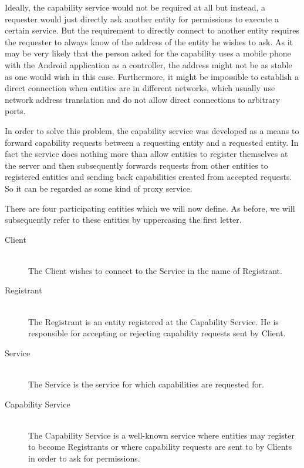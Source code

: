 Ideally, the capability service would not be required at all but instead, a requester would just directly ask another entity for permissions to execute a certain service.
But the requirement to directly connect to another entity requires the requester to always know of the address of the entity he wishes to ask.
As it may be very likely that the person asked for the capability uses a mobile phone with the Android application as a controller, the address might not be as stable as one would wish in this case.
Furthermore, it might be impossible to establish a direct connection when entities are in different networks, which usually use network address translation and do not allow direct connections to arbitrary ports.

In order to solve this problem, the capability service was developed as a means to forward capability requests between a requesting entity and a requested entity.
In fact the service does nothing more than allow entities to register themselves at the server and then subsequently forwards requests from other entities to registered entities and sending back capabilities created from accepted requests.
So it can be regarded as some kind of proxy service.

There are four participating entities which we will now define.
As before, we will subsequently refer to these entities by uppercasing the first letter.
\begin{description}
    \item[Client]\hfill\\
        The Client wishes to connect to the Service in the name of Registrant.
    \item[Registrant]\hfill\\
        The Registrant is an entity registered at the Capability Service.
        He is responsible for accepting or rejecting capability requests sent by Client.
    \item[Service]\hfill\\
        The Service is the service for which capabilities are requested for.
    \item[Capability Service]\hfill\\
        The Capability Service is a well-known service where entities may register to become Registrants or where capability requests are sent to by Clients in order to ask for permissions.
\end{description}

